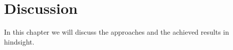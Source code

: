 \section{Discussion}\label{sec:discussion}
In this chapter we will discuss the approaches and the achieved results in hindsight.\\\\
